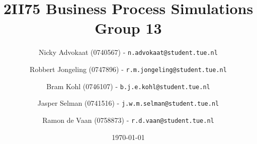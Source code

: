 \documentclass[a4paper,11pt]{article}
\title{
	2II75 Business Process Simulations \\
	\small{Group 13}
}
\author{
	Nicky Advokaat (0740567) - \texttt{n.advokaat@student.tue.nl}
	\and
	Robbert Jongeling (0747896) - \texttt{r.m.jongeling@student.tue.nl}
	\and
	Bram Kohl (0746107) - \texttt{b.j.e.kohl@student.tue.nl}
	\and
	Jasper Selman (0741516) - \texttt{j.w.m.selman@student.tue.nl}
	\and
	Ramon de Vaan (0758873) - \texttt{r.d.vaan@student.tue.nl}
}
\date{\today}
\begin{document}
	\maketitle
	
	
	
	
	
	
		
	\newpage
	\begin{appendix}
	
    
	\end{appendix}
\end{document}
